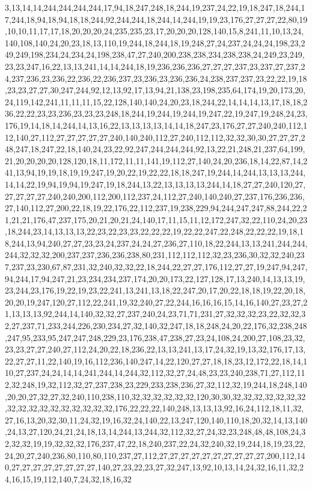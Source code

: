 3,13,14,14,244,244,244,244,17,94,18,247,248,18,244,19,237,24,22,19,18,247,18,244,17,244,18,94,18,94,18,18,244,92,244,244,18,244,14,244,19,19,23,176,27,27,27,22,80,19,10,10,11,17,17,18,20,20,20,24,235,235,23,17,20,20,20,128,140,15,8,241,11,10,13,24,140,108,140,24,20,23,18,13,110,19,244,18,244,18,19,248,27,24,237,24,24,24,198,23,249,249,198,234,24,234,24,198,238,47,27,240,200,238,238,234,238,238,24,249,23,249,23,23,247,16,22,13,13,241,14,14,244,18,19,236,236,236,27,27,27,237,23,237,27,237,24,237,236,23,236,22,236,22,236,237,23,236,23,236,236,24,238,237,237,23,22,22,19,18,23,23,27,27,30,247,244,92,12,13,92,17,13,94,21,138,23,198,235,64,174,19,20,173,20,24,119,142,241,11,11,11,15,22,128,140,140,24,20,23,18,244,22,14,14,14,13,17,18,18,236,22,22,23,23,236,23,23,23,248,18,244,19,244,19,244,19,247,22,19,247,19,248,24,23,176,19,14,18,14,244,14,13,16,22,13,13,13,13,14,14,18,247,23,176,27,27,240,240,112,112,140,27,112,27,27,27,27,27,240,140,240,112,27,240,112,112,32,32,30,30,27,27,27,248,247,18,247,22,18,140,24,23,22,92,247,244,244,244,92,13,22,21,248,21,237,64,199,21,20,20,20,20,128,120,18,11,172,11,11,141,19,112,27,140,24,20,236,18,14,22,87,14,241,13,94,19,19,18,19,19,247,19,20,22,19,22,22,18,18,247,19,244,14,244,13,13,13,244,14,14,22,19,94,19,94,19,247,19,18,244,13,22,13,13,13,13,244,14,18,27,27,240,120,27,27,27,27,27,240,240,200,112,200,112,237,24,112,27,240,140,240,27,237,176,236,236,27,140,112,27,200,22,18,19,22,176,22,112,237,19,238,229,94,244,247,247,88,244,22,21,21,21,176,47,237,175,20,21,20,21,24,140,17,11,15,11,12,172,247,32,22,110,24,20,23,18,244,23,14,13,13,13,22,23,22,23,23,22,22,22,19,22,22,247,22,248,22,22,22,19,18,18,244,13,94,240,27,27,23,23,24,237,24,24,27,236,27,110,18,22,244,13,13,241,244,244,244,32,32,32,200,237,237,236,236,238,80,231,112,112,112,32,23,236,30,32,32,240,237,237,23,230,67,87,231,32,240,32,32,22,18,244,22,27,27,176,112,27,27,19,247,94,247,94,244,17,94,247,21,23,234,234,237,174,20,20,173,22,127,128,17,13,240,14,13,13,19,23,244,23,176,19,22,19,23,22,241,13,241,13,18,22,247,20,17,20,22,18,18,19,22,20,18,20,20,19,247,120,27,112,22,241,19,32,240,27,22,244,16,16,16,15,14,16,140,27,23,27,21,13,13,13,92,244,14,140,32,32,27,237,240,24,23,71,71,231,27,32,32,32,23,22,32,32,32,27,237,71,233,244,226,230,234,27,32,140,32,247,18,18,248,24,20,22,176,32,238,248,247,95,233,95,247,247,248,229,23,176,238,47,238,27,23,24,108,24,200,27,108,23,32,23,23,27,27,240,27,112,24,20,22,18,236,22,13,13,241,13,17,24,32,19,13,32,176,17,13,22,27,27,11,22,140,19,16,112,236,140,247,14,22,120,27,27,18,18,23,12,172,22,18,14,110,27,237,24,24,14,14,241,244,14,244,32,112,32,27,24,48,23,23,240,238,71,27,112,112,32,248,19,32,112,32,27,237,238,23,229,233,238,236,27,32,112,32,19,244,18,248,140,20,20,27,32,27,32,240,110,238,110,32,32,32,32,32,32,120,30,30,32,32,32,32,32,32,32,32,32,32,32,32,32,32,32,32,32,176,22,22,22,140,248,13,13,13,92,16,24,112,18,11,32,27,16,13,20,32,30,11,24,32,19,16,32,24,140,22,13,247,120,140,110,18,20,32,14,13,140,24,13,27,120,24,21,24,18,13,14,244,13,244,32,112,32,27,24,32,23,248,48,48,108,24,32,32,32,19,19,32,32,32,176,237,47,22,18,240,237,22,24,32,240,32,19,244,18,19,23,22,24,20,27,240,236,80,110,80,110,237,27,112,27,27,27,27,27,27,27,27,27,27,200,112,140,27,27,27,27,27,27,27,27,140,27,23,22,23,27,32,247,13,92,10,13,14,24,32,16,11,32,24,16,15,19,112,140,7,24,32,18,16,32